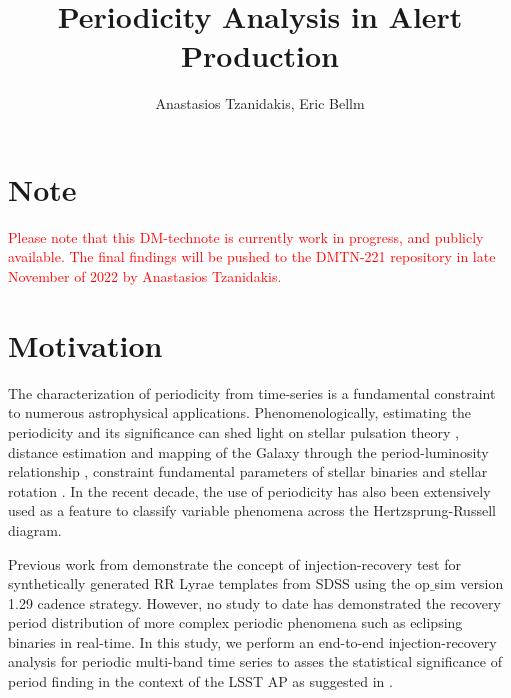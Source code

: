 \documentclass[DM,authoryear,toc]{lsstdoc}
\title{Periodicity Analysis in Alert Production}
\author{%
Anastasios Tzanidakis, Eric Bellm
}
\date{\vcsDate}
\begin{document}
\maketitle


\section{Note}
\textcolor{red}{Please note that this DM-technote is currently work in progress, and publicly available. The final findings will be pushed to the DMTN-221 repository in late November of 2022 by Anastasios Tzanidakis.}


\section{Motivation}
The characterization of periodicity from time-series is a fundamental constraint to numerous astrophysical applications. Phenomenologically, estimating the periodicity and its significance can shed light on stellar pulsation theory \citep{Antonello:Antonello81}, distance estimation and mapping of the Galaxy through the period-luminosity relationship \citep{Skowron:Skowron2019}, constraint fundamental parameters of stellar binaries \citep{Farinella:Farinella1979} and stellar rotation \citep{Walkowicz:Walkowicz13}. In the recent decade, the use of periodicity has also been extensively used as a feature to classify variable phenomena \citep{Richards:R13} across the Hertzsprung-Russell diagram. 

Previous work from \cite{2012AJ....144....9O} demonstrate the concept of injection-recovery test for synthetically generated RR Lyrae templates from SDSS using the op$\_$sim version 1.29 cadence strategy. However, no study to date has demonstrated the recovery period distribution of more complex periodic phenomena such as eclipsing binaries in real-time. In this study, we perform an end-to-end injection-recovery analysis for periodic multi-band time series to asses the statistical significance of period finding in the context of the LSST AP as suggested in .
\end{document}
